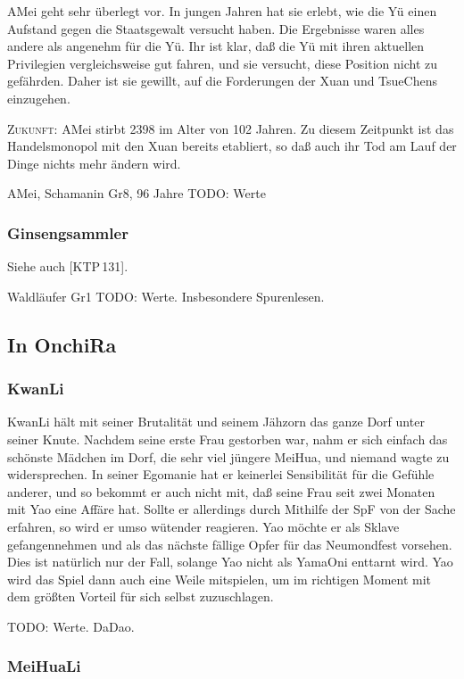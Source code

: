 \documentclass[
a4paper,
twoside,
DIV=calc,
BCOR=4mm,
fontsize=9pt,
twocolumn=on,
titlepage=on,
parskip=half
]{scrartcl}
\begin{document}
AMei geht sehr überlegt vor. In jungen Jahren hat sie erlebt, wie die
Yü einen Aufstand gegen die Staatsgewalt versucht haben. Die
Ergebnisse waren alles andere als angenehm für die Yü. Ihr ist klar,
daß die Yü mit ihren aktuellen Privilegien vergleichsweise gut fahren,
und sie versucht, diese Position nicht zu gefährden. Daher ist sie
gewillt, auf die Forderungen der Xuan und TsueChens einzugehen.

\textsc{Zukunft:} AMei stirbt 2398 im Alter von 102 Jahren. Zu diesem
Zeitpunkt ist das Handelsmonopol mit den Xuan bereits etabliert, so
daß auch ihr Tod am Lauf der Dinge nichts mehr ändern wird.

AMei, Schamanin Gr8, 96 Jahre
TODO: Werte

\subsubsection{Ginsengsammler}

Siehe auch [KTP\,131].

Waldläufer Gr1
TODO: Werte. Insbesondere Spurenlesen.

\subsection{In OnchiRa}

\subsubsection{KwanLi}

KwanLi hält mit seiner Brutalität und seinem Jähzorn das ganze Dorf
unter seiner Knute. Nachdem seine erste Frau gestorben war, nahm er
sich einfach das schönste Mädchen im Dorf, die sehr viel jüngere
MeiHua, und niemand wagte zu widersprechen. In seiner Egomanie hat er
keinerlei Sensibilität für die Gefühle anderer, und so bekommt er auch
nicht mit, daß seine Frau seit zwei Monaten mit Yao eine Affäre
hat. Sollte er allerdings durch Mithilfe der SpF von der Sache
erfahren, so wird er umso wütender reagieren. Yao möchte er als Sklave
gefangennehmen und als das nächste fällige Opfer für das Neumondfest
vorsehen. Dies ist natürlich nur der Fall, solange Yao nicht als
YamaOni enttarnt wird. Yao wird das Spiel dann auch eine Weile
mitspielen, um im richtigen Moment mit dem größten Vorteil für sich
selbst zuzuschlagen. 

TODO: Werte. DaDao.

\subsubsection{MeiHuaLi}
\end{document}
